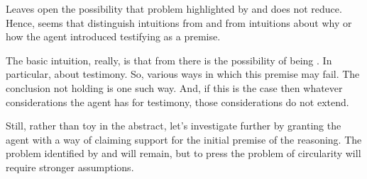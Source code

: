 \begin{note}




  Leaves open the possibility that problem highlighted by \ideaS{} and \ideaCS{} does not reduce.
  Hence, seems that distinguish intuitions from \ideaS{} and \ideaCS{} from intuitions about why or how the agent introduced  testifying as a premise.
\end{note}

\begin{note}
  The basic intuition, really, is that from \ideaS{} there is the possibility of being \mom{}.
  In particular, \mistaken{} about testimony.
  So, various ways in which this premise may fail.
  The conclusion not holding is one such way.
  And, if this is the case then whatever considerations the agent has for testimony, those considerations do not extend.
\end{note}

\begin{note}
  Still, rather than toy in the abstract, let's investigate further by granting the agent with a way of claiming support for the initial premise of the reasoning.
  The problem identified by \ideaS{} and \ideaCS{} will remain, but to press the problem of circularity will require stronger assumptions.
\end{note}

